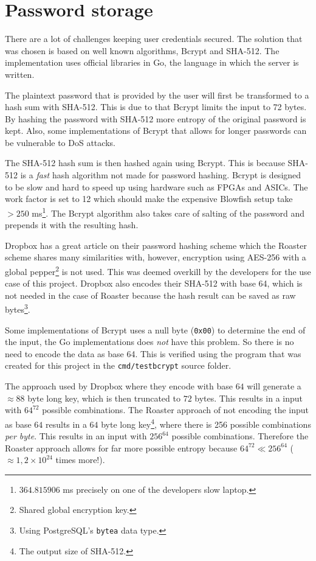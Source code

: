 \documentclass[12pt,a4paper]{report}
\begin{document}
\section{Password storage}
There are a lot of challenges keeping user credentials secured. The solution that was chosen is based on well known algorithms, Bcrypt and SHA-512. The implementation uses official libraries in Go, the language in which the server is written.

The plaintext password that is provided by the user will first be transformed to a hash sum with SHA-512. This is due to that Bcrypt limits the input to 72 bytes. By hashing the password with SHA-512 more entropy of the original password is kept. Also, some implementations of Bcrypt that allows for longer passwords can be vulnerable to DoS attacks\cite{bcrypt-length}.

The SHA-512 hash sum is then hashed again using Bcrypt. This is because
SHA-512 is a \textit{fast} hash algorithm not made for password hashing. Bcrypt is
designed to be slow and hard to speed up using hardware such as FPGAs and
ASICs. The work factor is set to 12 which should make the expensive Blowfish
setup take $> 250$ ms\footnote{$364.815906$ ms precisely on one of the developers slow laptop.}.
The Bcrypt algorithm also takes care of salting of the password and prepends 
it with the resulting hash.


Dropbox has a great article\cite{dropbox-passwords} on their password hashing scheme
which the Roaster scheme shares many similarities with, however, encryption using AES-256
with a global pepper\footnote{Shared global encryption key.} is not used. This was deemed overkill 
by the developers for the use case of this project. Dropbox also encodes their SHA-512 with base 64,
which is not needed in the case of Roaster because the hash result can be saved as raw
bytes\footnote{Using PostgreSQL's \texttt{bytea} data type.}.

Some implementations of Bcrypt uses a null byte (\texttt{0x00}) to determine the end
of the input\cite{bcrypt-bug}, the Go implementations does \textit{not} have this problem. So there
is no need to encode the data as base 64. This is verified using the program that was created for
this project in the \texttt{cmd/testbcrypt} source folder.

The approach used by Dropbox where they encode with base $64$ will generate a
$\approx 88$ byte long key, which is then truncated to $72$ bytes. This results in a
input with $64^{72}$ possible combinations. The Roaster approach of not encoding the
input as base $64$ results in a $64$ byte long key\footnote{The output size of SHA-512.},
where there is 256 possible combinations \textit{per byte}. This results in an input
with $256^{64}$ possible combinations. Therefore the Roaster approach allows for far more
possible entropy because $64^{72} \ll 256^{64}$ ($\approx 1,2 \times 10^{24}$ times more!).
\end{document}
